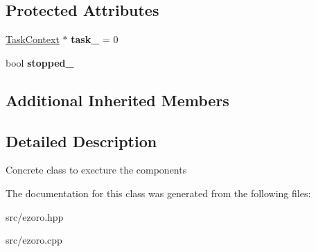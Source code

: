 \subsection*{Protected Attributes}
\begin{DoxyCompactItemize}
\item 
\hypertarget{classcoco_1_1_execution_engine_ae0729158d86ae748445f521baea61d7a}{\hyperlink{classcoco_1_1_task_context}{Task\-Context} $\ast$ {\bfseries task\-\_\-} = 0}\label{classcoco_1_1_execution_engine_ae0729158d86ae748445f521baea61d7a}

\item 
\hypertarget{classcoco_1_1_execution_engine_a5a3c72d66f0395812ca730c826690a66}{bool {\bfseries stopped\-\_\-}}\label{classcoco_1_1_execution_engine_a5a3c72d66f0395812ca730c826690a66}

\end{DoxyCompactItemize}
\subsection*{Additional Inherited Members}


\subsection{Detailed Description}
Concrete class to execture the components 

The documentation for this class was generated from the following files\-:\begin{DoxyCompactItemize}
\item 
src/ezoro.\-hpp\item 
src/ezoro.\-cpp\end{DoxyCompactItemize}
